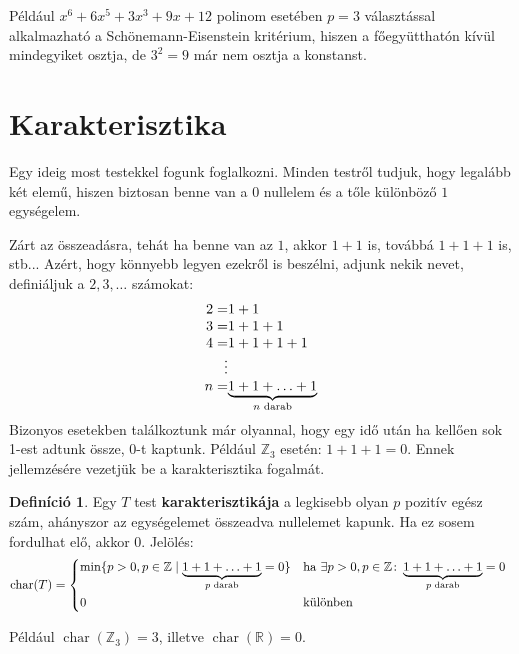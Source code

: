 \documentclass[12pt]{book}
\theoremstyle{plain} %
\theoremstyle{definition} %
\newtheorem{defi/}{Definíció}[section]
\newenvironment{defi}
  {\renewcommand{\qedsymbol}{$\clubsuit$}%
   \pushQED{\qed}\begin{defi/}}
  {\popQED\end{defi/}}
\theoremstyle{remark}
\renewcommand\qedsymbol{$\blacksquare$}
\newcommand\cha{\operatorname{char}}
\numberwithin{equation}{section}  %
\begin{document}
	Például $x^6+6x^5+3x^3+9x+12$ polinom esetében $p=3$ választással alkalmazható a Schönemann-Eisenstein kritérium, hiszen a főegyütthatón kívül mindegyiket osztja, de $3^2=9$ már nem osztja a konstanst.
	
	
	\section{Karakterisztika}
	Egy ideig most testekkel fogunk foglalkozni. Minden testről tudjuk, hogy legalább két elemű, hiszen biztosan benne van a $0$ nullelem és a tőle különböző $1$ egységelem.
	
	Zárt az összeadásra, tehát ha benne van az $1$, akkor $1+1$ is, továbbá $1+1+1$ is, stb... Azért, hogy könnyebb legyen ezekről is beszélni, adjunk nekik nevet, definiáljuk a $2,3,\ldots$ számokat:
	\[
	\setlength\arraycolsep{0pt}
	\begin{array}{r l}
	2 = & 1+1 \\
	3 = & 1+1+1 \\
	4 = & 1+1+1+1 \\ 
	\vdots \\
	n = & \underbrace{1+1+\ldots+1}_{n \text{ darab}}
	\end{array}
	\]
	Bizonyos esetekben találkoztunk már olyannal, hogy egy idő után ha kellően sok 1-est adtunk össze, 0-t kaptunk. Például $\mathbb{Z}_3$ esetén: $1+1+1=0$. Ennek jellemzésére vezetjük be a karakterisztika fogalmát.
	\begin{defi}
		Egy $T$ test \textbf{karakterisztikája} a legkisebb olyan $p$ pozitív egész szám, ahányszor az egységelemet összeadva nullelemet kapunk. Ha ez sosem fordulhat elő, akkor 0. Jelölés:
		\[ \cha(T) =
		\begin{cases*}
			\min\{ {p>0, p\in \mathbb{Z} \mid \underbrace{1+1+\ldots+1}_{p\text{ darab}} = 0} \} & ha $\exists p>0, p\in\mathbb{Z} \colon \underbrace{1+1+\ldots+1}_{p\text{ darab}} = 0$ \\
			0 & különben
		\end{cases*}
		  \]
	\end{defi}	
	Például $\cha(\mathbb{Z}_3)=3$, illetve $\cha(\mathbb{R})=0$.
	
\end{document}
